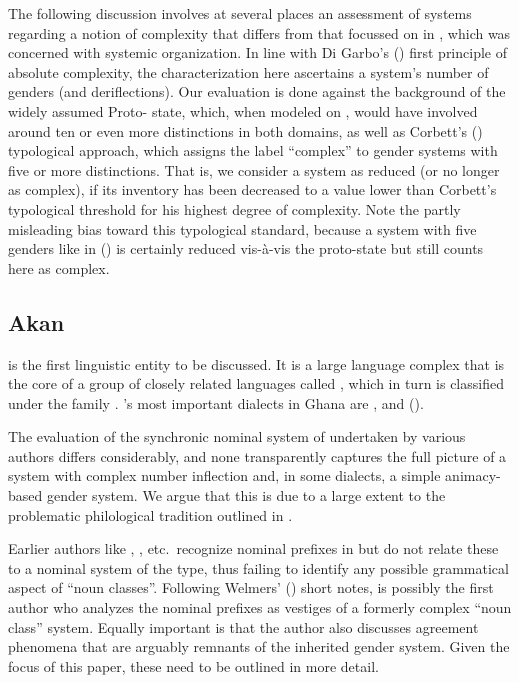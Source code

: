 \documentclass[output=collectionpaper]{langsci/langscibook}
\begin{document}
The following discussion involves at several places an assessment of  systems regarding a notion of complexity that differs from that focussed on in , which was concerned with systemic organization. In line with Di Gar\-bo's (\citeyear[41, 179]{DiGarbo2014}) first principle of absolute complexity, the characterization here ascertains a system's number of genders (and deriflections). Our evaluation is done against the background of the widely assumed Proto- state, which, when modeled on , would have involved around ten or even more distinctions in both domains, as well as Corbett's (\citeyear{Corbett2013}) typological approach, which assigns the label ``complex'' to gender systems with five or more distinctions. That is, we consider a  system as reduced (or no longer as complex), if its inventory has been decreased to a value lower than Corbett's typological threshold for his highest degree of complexity. Note the partly misleading bias toward this typological standard, because a system with five genders like in  () is certainly reduced vis-à-vis the proto-state but still counts here as complex.


\subsection{Akan}
\label{sec:Gueld:3.2}

 is the first linguistic entity to be discussed. It is a large language complex that is the core of a group of closely related languages called , which in turn is classified under the  family \citep{Stewart2002}. 's most important dialects in Ghana are ,  and  (\citealt[57]{Dolphyne1988}).

The evaluation of the synchronic nominal system of  undertaken by various authors differs considerably, and none transparently captures the full picture of a system with complex number inflection and, in some dialects, a simple animacy-based gender system. We argue that this is due to a large extent to the problematic philological  tradition outlined in .

Earlier authors like \citet{Christaller1875}, \citet{Dolphyne1988}, etc.\ recognize nominal prefixes in  but do not relate these to a nominal system of the  type, thus failing to identify any possible grammatical aspect of ``noun classes''. Following Welmers' (\citeyear[4--5]{Welmers1971}) short notes, \citet{Osam1993} is possibly the first author who analyzes the nominal prefixes as vestiges of a formerly complex ``noun class'' system. Equally important is that the author also discusses agreement phenomena that are arguably remnants of the inherited  gender system. Given the focus of this paper, these need to be outlined in more detail.
\end{document}
